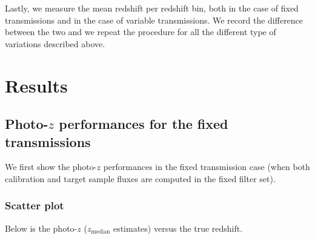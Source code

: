 \documentclass[11pt]{article}
\begin{document}
Lastly, we measure the mean redshift per redshift bin, both in the case
of fixed transmissions and in the case of variable transmissions. We
record the difference between the two and we repeat the procedure for
all the different type of variations described above.

    \section{Results}\label{results}

\subsection{\texorpdfstring{Photo-\(z\) performances for the fixed
transmissions}{Photo-z performances for the fixed transmissions}}\label{photo-z-performances-for-the-fixed-transmissions}

We first show the photo-\(z\) performances in the fixed transmission
case (when both calibration and target sample fluxes are computed in the
fixed filter set).

\subsubsection{Scatter plot}\label{scatter-plot}

Below is the photo-\(z\) (\(z_\mathrm{median}\) estimates) versus the
true redshift.
\end{document}
